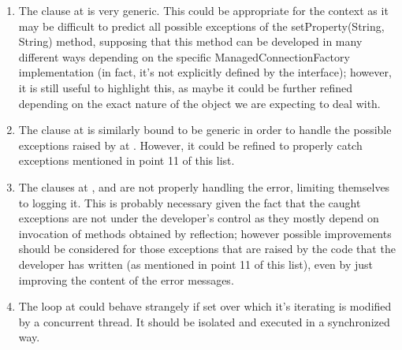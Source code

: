 \begin{enumerate}
\begin{itemize}
		\end{itemize}
	\item {} The  clause at  is very generic. This could be appropriate for the context as it may be difficult to predict all possible exceptions of the setProperty(String, String) method, supposing that this method can be developed in many different ways depending on the specific ManagedConnectionFactory implementation (in fact, it's not explicitly defined by the interface); however, it is still useful to highlight this, as maybe it could be further refined depending on the exact nature of the object we are expecting to deal with. 
	\item {} The  clause at  is similarly bound to be generic in order to handle the possible exceptions raised by  at . However, it could be refined to properly catch exceptions mentioned in point 11 of this list. 
	\item {} The  clauses at ,  and  are not properly handling the error, limiting themselves to logging it. This is probably necessary given the fact that the caught exceptions are not under the developer's control as they mostly depend on invocation of methods obtained by reflection; however possible improvements should be considered for those exceptions that are raised by the code that the developer has written (as mentioned in point 11 of this list), even by just improving the content of the error messages. 
	\item {} The  loop at  could behave strangely if set over which it's iterating is modified by a concurrent thread. It should be isolated and executed in a synchronized way. 
	\end{enumerate}
